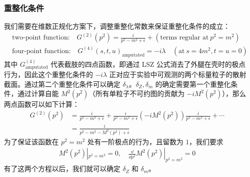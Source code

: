 \subsubsection{重整化条件}
我们需要在维数正规化方案下，调整重整化常数来保证重整化条件的成立：
\begin{equation}
\begin{aligned}
&\text{two-point function:}\quad G^{(2)}(p^2)=\frac{i}{p^2-m^2+\epsilon}+(\text{terms regular at}\ p^2=m^2)\\
&\text{four-point function:}\quad G^{(4)}(s,t,u)_\text{amputated}=-i\lambda\quad (\text{at}\ s=4m^2,t=u=0)
\end{aligned}
\end{equation}
其中 $G^{(4)}_\text{amputated}$ 代表截肢的四点函数，即通过 LSZ 公式消去了外腿在壳时的极点行为，因此这个重整化条件的 $-i\lambda$ 正对应于实验中可观测的两个标量粒子的散射截面。通过第二个重整化条件可以确定 $\delta_\lambda$。$\delta_Z,\delta_m$ 的确定需要第一个重整化条件，通过计算自能 $M^2(p^2)$（所有单粒子不可约图的贡献为 $-iM^2(p^2)$），那么两点函数可以如下计算：
\begin{equation}
\begin{aligned}
G^{(2)}(p^2)&=\frac{i}{p^2-m^2+\epsilon}+\frac{i}{p^2-m^2+\epsilon} (-iM^2(p^2))\frac{i}{p^2-m^2+\epsilon}+\cdots\\
&=\frac{i}{p^2-m^2-M^2(p^2)+\epsilon}
\end{aligned}
\end{equation}
为了保证该函数在 $p^2=m^2$ 处有一阶极点的行为，且留数为 $1$，我们要求
\begin{equation}
\begin{aligned}
M^2(p^2)|_{p^2=m^2}=0,\quad \frac{\dd }{\dd p^2} M^2(p^2) |_{p^2=m^2}=0
\end{aligned}
\end{equation}
有了这两个方程以后，我们就可以确定 $\delta_Z$ 和 $\delta_m$。

